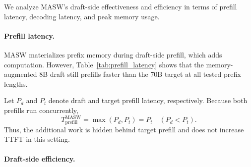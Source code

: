 We analyze MASW's draft-side effectiveness and efficiency in terms of prefill latency, decoding latency, and peak memory usage.

\paragraph{Prefill latency.}
MASW materializes prefix memory during draft-side prefill, which adds computation.
However, Table~\ref{tab:prefill_latency} shows that the memory-augmented 8B draft still prefills faster than the 70B target at all tested prefix lengths.

\begin{table}[H]
    \centering
    \caption{Prefill latency (ms) across prefix lengths.}
    \label{tab:prefill_latency}
\end{table}

Let $P_d$ and $P_t$ denote draft and target prefill latency, respectively.
Because both prefills run concurrently,
\begin{equation}
    T_{\mathrm{prefill}}^{\mathrm{MASW}} = \max(P_d,P_t) = P_t \quad (P_d<P_t).
\end{equation}
Thus, the additional work is hidden behind target prefill and does not increase TTFT in this setting.

\paragraph{Draft-side efficiency.}



